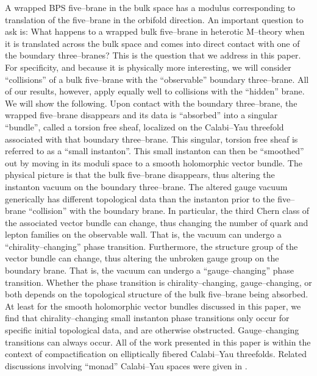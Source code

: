 \documentclass[a4paper,12pt]{article}
\numberwithin{equation}{section}
\theoremstyle{plain}
\begin{document}
A wrapped BPS five--brane in the bulk space has a modulus corresponding to
translation of the five--brane in the orbifold direction. An important
question to ask is: What happens to a wrapped bulk five--brane in heterotic
M--theory when it is
translated across the bulk space and comes into direct contact with one of the
boundary three--branes? This is the question that we address in this paper.
For specificity, and because it is physically more interesting, 
we will consider ``collisions'' of a bulk five--brane with
the ``observable'' boundary three--brane. All of our results, however, apply
equally well to collisions with the ``hidden'' brane. We
will show the following. Upon contact with the boundary three--brane, the
wrapped five--brane disappears and its data is ``absorbed'' into a singular
``bundle'', called a torsion free sheaf, localized on the Calabi--Yau
threefold associated with that boundary three--brane. This singular, torsion
free sheaf is referred to as a ``small instanton''\cite{Wi2}. This small instanton can
then be ``smoothed'' out by moving in its moduli space to a smooth holomorphic
vector bundle. The physical picture is that the bulk five--brane disappears,
thus altering the instanton vacuum on the boundary three--brane. The altered
gauge vacuum generically has different topological data than the instanton
prior to the five--brane ``collision'' with the boundary brane. In particular,
the third Chern class of the associated vector bundle can change, thus
changing the number of quark and lepton families on the observable wall. That
is, the vacuum can undergo a ``chirality--changing'' phase transition.
Furthermore, the structure group of the vector bundle can change, thus
altering the unbroken gauge group on the boundary brane. That is, the vacuum
can undergo a ``gauge--changing'' phase transition. Whether the phase
transition is chirality--changing, gauge--changing, or both depends on the
topological structure of the bulk five--brane being absorbed. At least for the
smooth holomorphic vector bundles discussed in this paper, we find that
chirality--changing small instanton phase transitions only occur for specific
initial topological data, and are otherwise obstructed. Gauge--changing
transitions can always occur. All of the work presented in this paper is
within the context of compactification on elliptically fibered Calabi--Yau 
threefolds. Related discussions involving ``monad'' Calabi--Yau spaces were
given in \cite{EvKa}.
\end{document}
